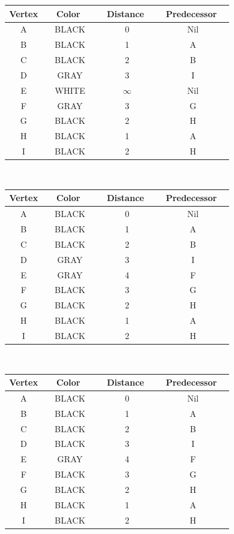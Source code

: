 \documentclass[12pt]{article}
\newcommand{\vs}{\vspace{2mm}}
\newcommand{\hs}{\hspace{10mm}}
\newcommand{\ha}{\hspace{1mm}}
\begin{document}

\begin{tabular}{|c|c|c|c|} \hline
  Vertex  & \hs\ \ha\  Color \hs\ \ha\ & \hs\  Distance \hs\ & \ha\ Predecessor \ha\  \\ \hline
  A & BLACK & 0 & Nil \\ \hline
  B & BLACK & 1 & A \\ \hline
  C & BLACK & 2 & B \\ \hline
  D & GRAY & 3 & I \\ \hline
  E & WHITE & $\infty$ & Nil \\ \hline
  F & GRAY & 3 & G \\ \hline
  G & BLACK & 2 & H \\ \hline
  H & BLACK & 1 & A \\ \hline
  I & BLACK & 2 & H \\ \hline
\end{tabular}
\vs\


\begin{tabular}{|c|c|c|c|} \hline
  Vertex  & \hs\ \ha\  Color \hs\ \ha\ & \hs\  Distance \hs\ & \ha\ Predecessor \ha\  \\ \hline
  A & BLACK & 0 & Nil \\ \hline
  B & BLACK & 1 & A \\ \hline
  C & BLACK & 2 & B \\ \hline
  D & GRAY & 3 & I \\ \hline
  E & GRAY & 4 & F \\ \hline
  F & BLACK & 3 & G \\ \hline
  G & BLACK & 2 & H \\ \hline
  H & BLACK & 1 & A \\ \hline
  I & BLACK & 2 & H \\ \hline
\end{tabular}
\vs\


\begin{tabular}{|c|c|c|c|} \hline
  Vertex  & \hs\ \ha\  Color \hs\ \ha\ & \hs\  Distance \hs\ & \ha\ Predecessor \ha\  \\ \hline
  A & BLACK & 0 & Nil \\ \hline
  B & BLACK & 1 & A \\ \hline
  C & BLACK & 2 & B \\ \hline
  D & BLACK & 3 & I \\ \hline
  E & GRAY & 4 & F \\ \hline
  F & BLACK & 3 & G \\ \hline
  G & BLACK & 2 & H \\ \hline
  H & BLACK & 1 & A \\ \hline
  I & BLACK & 2 & H \\ \hline
\end{tabular}
\vs\
\end{document}
